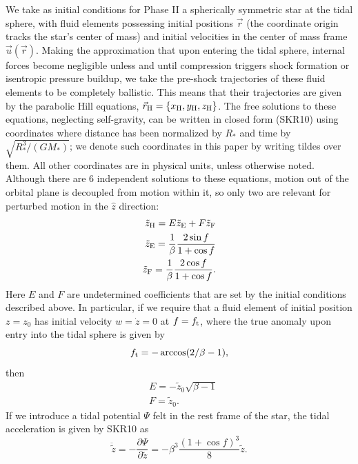 \documentclass[useAMS, twocolumn, usenatbib]{mn2e}
\begin{document}
We take as initial conditions for Phase II a spherically symmetric star at the tidal sphere, with fluid elements possessing initial positions $\vec{r}$ (the coordinate origin tracks the star's center of mass) and initial velocities in the center of mass frame $\vec{u}(\vec{r})$.  Making the approximation that upon entering the tidal sphere, internal forces become negligible unless and until compression triggers shock formation or isentropic pressure buildup, we take the pre-shock trajectories of these fluid elements to be completely ballistic.  This means that their trajectories are given by the parabolic Hill equations, $\vec{r}_{\rm H}=\{x_{\rm H}, y_{\rm H}, z_{\rm H}\}$.  The free solutions to these equations, neglecting self-gravity, can be written in closed form (SKR10) using coordinates where distance has been normalized by $R_{*}$ and time by $\sqrt{R_{*}^3/(GM_{*})}$; we denote such coordinates in this paper by writing tildes over them.  All other coordinates are in physical units, unless otherwise noted.  Although there are 6 independent solutions to these equations, motion out of the orbital plane is decoupled from motion within it, so only two are relevant for perturbed motion in the $\hat{z}$ direction:
\begin{align}
\tilde{z}_{\rm H}=E \tilde{z}_{\rm E} + F \tilde{z}_{\rm F} \notag \label{ansatz} \\
\tilde{z}_{\rm E}=\frac{1}{\beta}\frac{2\sin f}{1+\cos f}  \\
\tilde{z}_{\rm F}=\frac{1}{\beta}\frac{2\cos f}{1+\cos f}. \notag
\end{align}
Here $E$ and $F$ are undetermined coefficients that are set by the initial conditions described above.  In particular, if we require that a fluid element of initial position $z=z_0$ has initial velocity $w=\dot{z}=0$ at $f=f_{\rm t}$, where the true anomaly upon entry into the tidal sphere is given by 
\begin{equation}
f_{\rm t}=-\arccos(2/\beta-1), \label{ft}
\end{equation}
then
\begin{align}
&E=-\tilde{z}_0 \sqrt{\beta-1} \\
&F=\tilde{z}_0. 
\end{align}
If we introduce a tidal potential $\Psi$ felt in the rest frame of the star, the tidal acceleration is given by SKR10 as
\begin{equation}
\ddot{\tilde{z}}=-\frac{\partial \Psi}{\partial \tilde{z}}=-\beta^3 \frac{(1+\cos f)^3}{8}\tilde{z}. \label{selfSimilar}
\end{equation}
\end{document}
